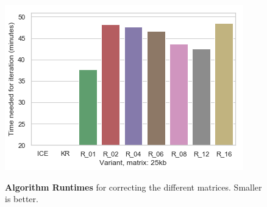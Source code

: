 
\begin{figure}[!tbp]
\begin{centering}
    {\includegraphics[scale=0.8]{figures/results/compute_multi_25}}
    \caption[Multicore comparison]
    {\textbf{Algorithm Runtimes} for correcting the different matrices. Smaller is better.}
    \label{fig:computetime25}
\end{centering}
\end{figure}


